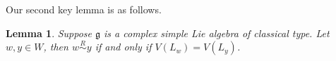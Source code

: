 \documentclass{amsart}[12pt]
\newtheorem{Lem}{Lemma}[section]
\newtheorem{Rem}{Remark}[section]
\renewcommand{\subset}{\subseteq}
\numberwithin{equation}{section}
\begin{document}







Our second key lemma is as follows.

\begin{Lem}\label{m1} Suppose $\mathfrak{g}$ is a complex simple Lie algebra of classical type. Let  $w,y\in W$, then $w\stackrel{R}{\sim} y$ if and only if $V(L_w)=V(L_y)$.
\end{Lem}
\end{document}

